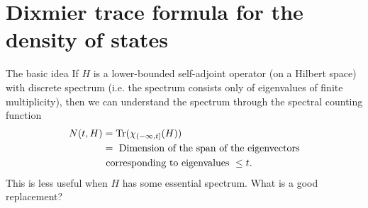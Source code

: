 \documentclass{beamer}
\numberwithin{equation}{section}
\theoremstyle{plain}
\theoremstyle{plain}
\theoremstyle{definition}
\theoremstyle{plain}
\theoremstyle{plain}
\theoremstyle{definition}
\newcommand{\tr}{{\rm Tr}}
\newcommand{\Vol}{\mathrm{Vol}}
\newcommand{\Rl}{\mathbb{R}}
\begin{document}
\section{Dixmier trace formula for the density of states}
% 
\begin{frame}{The basic idea}
    If $H$ is a lower-bounded self-adjoint operator (on a Hilbert space) with discrete spectrum (i.e. the spectrum consists only of eigenvalues of finite multiplicity), then we can understand the spectrum through the spectral counting function
    \begin{align*}
        N(t,H) &= \tr(\chi_{(-\infty,t]}(H))\\
                     &= \text{ Dimension of the span of the eigenvectors}\\
                     &\text{ corresponding to eigenvalues }\leq t.
    \end{align*}
    \pause
    This is less useful when $H$ has some essential spectrum. What is a good replacement?

\end{frame} 
% 
\end{document}
